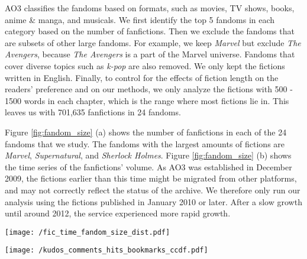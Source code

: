 \documentclass[letterpaper]{article} %
\begin{document}
AO3 classifies the fandoms based on formats, such as movies, TV shows, books, anime \& manga, and musicals. We first identify the top 5 fandoms in each category based on the number of fanfictions. Then we exclude the fandoms that are subsets of other large fandoms. For example, we keep \emph{Marvel} but exclude \emph{The Avengers}, because \emph{The Avengers} is a part of the Marvel universe. Fandoms that cover diverse topics such as \emph{k-pop} are also removed. We only kept the fictions written in English. Finally, to control for the effects of fiction length on the readers' preference and on our methods, we only analyze the fictions with 500 - 1500 words in each chapter, which is the range where most fictions lie in. This leaves us with 701,635 fanfictions in 24 fandoms. 

Figure \ref{fig:fandom_size} (a) shows the number of fanfictions in each of the 24 fandoms that we study. The fandoms with the largest amounts of fictions are \emph{Marvel}, \emph{Supernatural}, and \emph{Sherlock Holmes}. Figure \ref{fig:fandom_size} (b) shows the time series of the fanfictions' volume. As AO3 was established in December 2009, the fictions earlier than this time might be migrated from other platforms, and may not correctly reflect the status of the archive. We therefore only run our analysis using the fictions published in January 2010 or later. After a slow growth until around 2012, the service experienced more rapid growth. 

\begin{figure*}
    \centering
        \texttt{[image: /fic\_time\_fandom\_size\_dist.pdf]}
        \caption{The size of fandoms and the number of fanfictions published in time.}
        \label{fig:fandom_size}    
    \end{figure*}
    
\begin{figure*}
    \centering
       \texttt{[image: /kudos\_comments\_hits\_bookmarks\_ccdf.pdf]}
        \caption{Log-lin complementary cumulative distribution of kudos, hits, bookmarks and comments. For multi-chapter fanfictions, we average these values over the number of chapters. Fat-tailed distributions are observed, where a small portion of fictions receive many kudos and comments, and most fictions receive few.}
        \label{fig:kudos_dist}
    \end{figure*}
\end{document}
